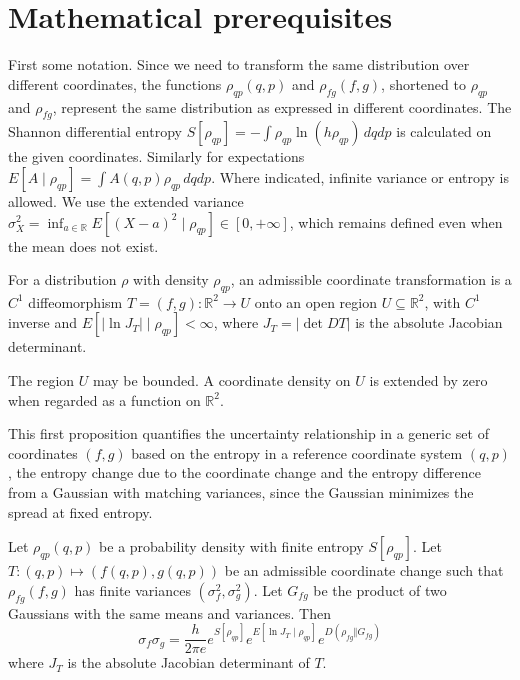 \documentclass{techbrief}
\begin{document}
\section{Mathematical prerequisites}

First some notation. Since we need to transform the same distribution over different coordinates, the functions $\rho_{qp}(q,p)$ and $\rho_{fg}(f,g)$, shortened to $\rho_{qp}$ and $\rho_{fg}$, represent the same distribution as expressed in different coordinates. The Shannon differential entropy $S[\rho_{qp}]=-\int\rho_{qp}\ln(h \rho_{qp})\,dqdp$ is calculated on the given coordinates. Similarly for expectations $E[A\mid\rho_{qp}]=\int A(q,p)\rho_{qp}\,dqdp$. Where indicated, infinite variance or entropy is allowed. We use the extended variance $\sigma_X^2=\inf_{a\in\mathbb{R}}E[(X-a)^2\mid\rho_{qp}]\in[0,+\infty]$, which remains defined even when the mean does not exist.

\begin{defn}
	For a distribution $\rho$ with density $\rho_{qp}$, an admissible coordinate transformation is a $C^1$ diffeomorphism $T=(f,g):\mathbb{R}^2\to U$ onto an open region $U\subseteq\mathbb{R}^2$, with $C^1$ inverse and $E[|\ln J_T|\mid\rho_{qp}]<\infty$, where $J_T=|\det DT|$ is the absolute Jacobian determinant.
\end{defn}
The region $U$ may be bounded. A coordinate density on $U$ is extended by zero when regarded as a function on $\mathbb{R}^2$.

This first proposition quantifies the uncertainty relationship in a generic set of coordinates $(f,g)$ based on the entropy in a reference coordinate system $(q,p)$, the entropy change due to the coordinate change and the entropy difference from a Gaussian with matching variances, since the Gaussian minimizes the spread at fixed entropy.

\begin{prop}\label{entropyVarianceIdentity}
	Let $\rho_{qp}(q,p)$ be a probability density with finite entropy $S[\rho_{qp}]$. Let $T: (q,p) \mapsto (f(q,p),g(q,p))$ be an admissible coordinate change such that $\rho_{fg}(f,g)$ has finite variances $(\sigma_f^2,\sigma_g^2)$. Let $G_{fg}$ be the product of two Gaussians with the same means and variances. Then
	\begin{equation}\label{entropyVarianceEquality}
		\sigma_f\sigma_g=\frac{h}{2\pi e}e^{S[\rho_{qp}]}e^{E[\ln J_T\mid\rho_{qp}]}e^{D(\rho_{fg}\Vert G_{fg})}
	\end{equation}
	where $J_T$ is the absolute Jacobian determinant of $T$.
\end{prop}
\end{document}
